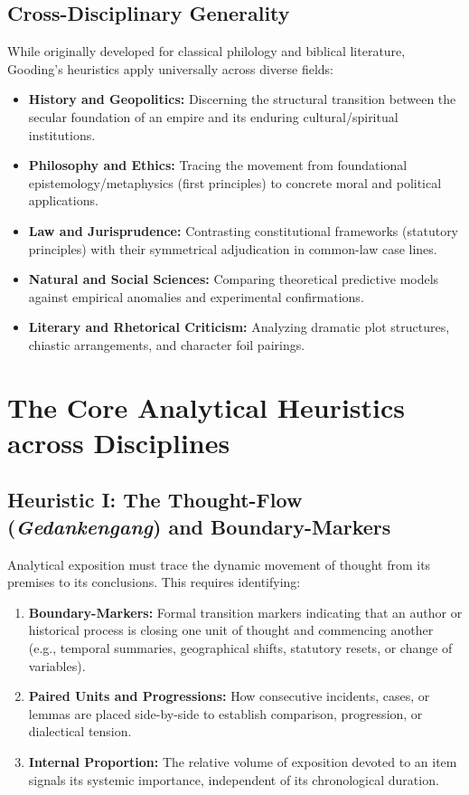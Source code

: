 \documentclass[11pt,letterpaper]{article}
\begin{document}
\subsection{Cross-Disciplinary Generality}
While originally developed for classical philology and biblical literature, Gooding's heuristics apply universally across diverse fields:
\begin{itemize}
  \item \textbf{History and Geopolitics:} Discerning the structural transition between the secular foundation of an empire and its enduring cultural/spiritual institutions.
  \item \textbf{Philosophy and Ethics:} Tracing the movement from foundational epistemology/metaphysics (first principles) to concrete moral and political applications.
  \item \textbf{Law and Jurisprudence:} Contrasting constitutional frameworks (statutory principles) with their symmetrical adjudication in common-law case lines.
  \item \textbf{Natural and Social Sciences:} Comparing theoretical predictive models against empirical anomalies and experimental confirmations.
  \item \textbf{Literary and Rhetorical Criticism:} Analyzing dramatic plot structures, chiastic arrangements, and character foil pairings.
\end{itemize}

\section{The Core Analytical Heuristics across Disciplines}

\subsection{Heuristic I: The Thought-Flow (\emph{Gedankengang}) and Boundary-Markers}
Analytical exposition must trace the dynamic movement of thought from its premises to its conclusions. This requires identifying:
\begin{enumerate}
  \item \textbf{Boundary-Markers:} Formal transition markers indicating that an author or historical process is closing one unit of thought and commencing another (e.g., temporal summaries, geographical shifts, statutory resets, or change of variables).
  \item \textbf{Paired Units and Progressions:} How consecutive incidents, cases, or lemmas are placed side-by-side to establish comparison, progression, or dialectical tension.
  \item \textbf{Internal Proportion:} The relative volume of exposition devoted to an item signals its systemic importance, independent of its chronological duration.
\end{enumerate}
\end{document}
